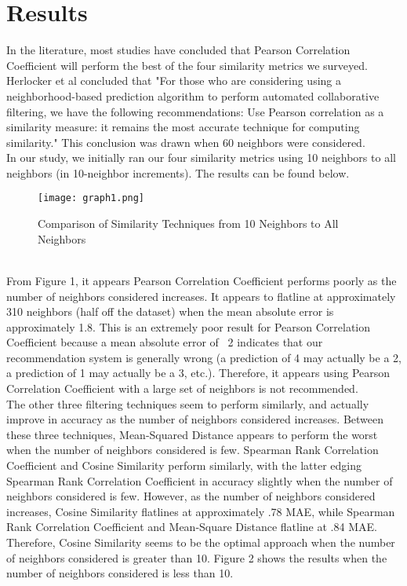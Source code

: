 \documentclass[11pt,letterpaper]{article}
\begin{document}
\section{Results}
In the literature, most studies have concluded that Pearson Correlation Coefficient will perform the best of the four similarity metrics we surveyed. Herlocker et al concluded that "For those who are considering using a neighborhood-based prediction algorithm to perform automated collaborative filtering, we have the following recommendations: Use Pearson correlation as a similarity measure: it remains the most accurate technique for computing similarity." This conclusion was drawn when 60 neighbors were considered. \\
In our study, we initially ran our four similarity metrics using 10 neighbors to all neighbors (in 10-neighbor increments). The results can be found below.
\begin{figure}[h]
\caption{Comparison of Similarity Techniques from 10 Neighbors to All Neighbors}
\texttt{[image: graph1.png]}
\centering
\end{figure}
\\
From Figure 1, it appears Pearson Correlation Coefficient performs poorly as the number of neighbors considered increases. It appears to flatline at approximately 310 neighbors (half off the dataset) when the mean absolute error is approximately 1.8. This is an extremely poor result for Pearson Correlation Coefficient because a mean absolute error of ~2 indicates that our recommendation system is generally wrong (a prediction of 4 may actually be a 2, a prediction of 1 may actually be a 3, etc.). Therefore, it appears using Pearson Correlation Coefficient with a large set of neighbors is not recommended. \\
The other three filtering techniques seem to perform similarly, and actually improve in accuracy as the number of neighbors considered increases. Between these three techniques, Mean-Squared Distance appears to perform the worst when the number of neighbors considered is few. Spearman Rank Correlation Coefficient and Cosine Similarity perform similarly, with the latter edging Spearman Rank Correlation Coefficient in accuracy slightly when the number of neighbors considered is few. However, as the number of neighbors considered increases, Cosine Similarity flatlines at approximately .78 MAE, while Spearman Rank Correlation Coefficient and Mean-Square Distance flatline at .84 MAE. Therefore, Cosine Similarity seems to be the optimal approach when the number of neighbors considered is greater than 10. Figure 2 shows the results when the number of neighbors considered is less than 10.
\end{document}
